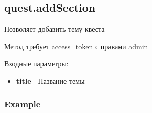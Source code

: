 \subsection{quest.addSection}

Позволяет добавить тему квеста

Метод требует access\_token с правами admin

Входные параметры:
\begin{itemize}
  \item \textbf{title} - Название темы
\end{itemize}

\subsubsection{Example}
\begin{Verbatim}[frame=single]

\end{Verbatim}